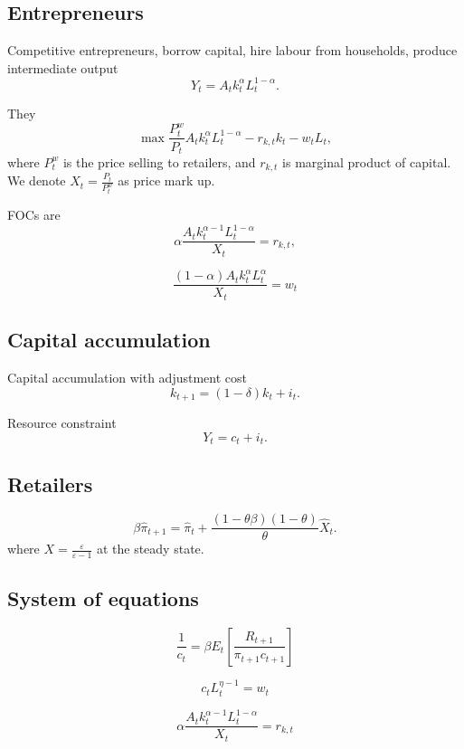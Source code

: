 \documentclass{article}
\begin{document}
\subsection{Entrepreneurs}

Competitive entrepreneurs, borrow capital, hire labour from households,
produce intermediate output%
\[
Y_{t}=A_{t}k_{t}^{\alpha }L_{t}^{1-\alpha }. 
\]

They%
\[
\max \frac{P_{t}^{w}}{P_{t}}A_{t}k_{t}^{\alpha }L_{t}^{1-\alpha
}-r_{k,t}k_{t}-w_{t}L_{t}, 
\]%
where $P_{t}^{w}$ is the price selling to retailers, and $r_{k,t}$ is
marginal product of capital. We denote $X_{t}=\frac{P_{t}}{P_{t}^{w}}$ as
price mark up.

FOCs are%
\begin{equation}
\alpha \frac{A_{t}k_{t}^{\alpha -1}L_{t}^{1-\alpha }}{X_{t}}=r_{k,t},
\label{MPK}
\end{equation}

\begin{equation}
\frac{\left( 1-\alpha \right) A_{t}k_{t}^{\alpha }L_{t}^{\alpha }}{X_{t}}%
=w_{t}  \label{MPL}
\end{equation}

\subsection{Capital accumulation}

Capital accumulation with adjustment cost%
\[
k_{t+1}=\left( 1-\delta \right) k_{t}+i_{t}. 
\]

Resource constraint%
\[
Y_{t}=c_{t}+i_{t}. 
\]

\subsection{Retailers}

\[
\beta \widehat{\pi }_{t+1}=\widehat{\pi }_{t}+\frac{\left( 1-\theta \beta
\right) \left( 1-\theta \right) }{\theta }\widehat{X}_{t}. 
\]%
where $X=\frac{\varepsilon }{\varepsilon -1}$ at the steady state.

\subsection{System of equations}

\[
\frac{1}{c_{t}}=\beta E_{t}\left[ \frac{R_{t+1}}{\pi _{t+1}c_{t+1}}\right] 
\]

\[
c_{t}L_{t}^{\eta -1}=w_{t} 
\]

\[
\alpha \frac{A_{t}k_{t}^{\alpha -1}L_{t}^{1-\alpha }}{X_{t}}=r_{k,t} 
\]
\end{document}

